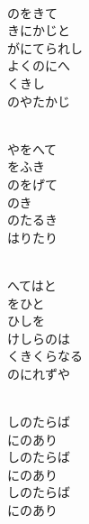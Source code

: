 \documentclass[10pt,b5j]{tarticle} %
\begin{document}
\begin{enumerate}
\begin{minipage}[c]{\blocksize}
        \vspace{\linespace}
        \item~\\
        のをきて\\
        きにかじと\\
        がにてられし\\
        よくのにへ\\
        くきし\\
        のやたかじ
        
        \vspace{\linespace}
        \item~\\
        やをへて\\
        をふき\\
        のをげて\\
        のき\\
        のたるき\\
        はりたり
        
        \vspace{\linespace}
        \item~\\
        へてはと\\
        をひと\\
        ひしを\\
        けしらのは\\
        くきくらなる\\
        のにれずや
        
        \vspace{\linespace}
        \item~\\
        しのたらば\\
        にのあり\\
        しのたらば\\
        にのあり\\
        しのたらば\\
        にのあり
        

\end{minipage}
\end{enumerate}
\end{document}
